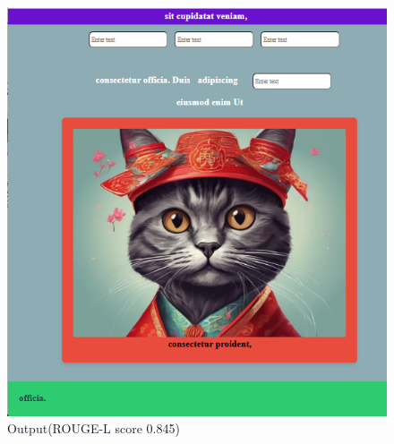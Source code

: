 \begin{figure}[H]
    \includegraphics[scale=.8]{images/m2o3.png}
    \centering
    \caption{Output(ROUGE-L score 0.845) }
    \label{fig:m21}
\end{figure}

